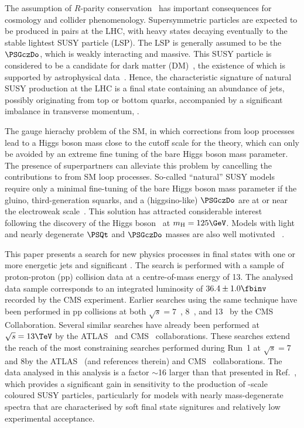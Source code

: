 The assumption of $R$-parity conservation~\cite{Farrar:1978xj} has
important consequences for cosmology and collider
phenomenology. Supersymmetric particles are expected to be produced in
pairs at the LHC, with heavy states decaying eventually to the stable
lightest SUSY particle (LSP). The LSP is generally assumed to be the
$\PSGczDo$, which is weakly interacting and massive. This SUSY
particle is considered to be a candidate for dark matter
(DM)~\cite{Jungman:1995df}, the existence of which is supported by
astrophysical data~\cite{1674-1137-38-9-090001}. Hence, the
characteristic signature of natural SUSY production at the LHC is a
final state containing an abundance of jets, possibly originating from
top or bottom quarks, accompanied by a significant imbalance in
transverse momentum, \ptvecmiss. 

The gauge hierachy problem of the SM, in which corrections from loop
processes lead to a Higgs boson mass \higgsmass close to the cutoff
scale for the theory, which can only be avoided by an extreme fine
tuning of the bare Higgs boson mass parameter. The presence of
superpartners can alleviate this problem by cancelling the
contributions to \higgsmass from SM loop processes. So-called
``natural'' SUSY models require only a minimal fine-tuning of the bare
Higgs boson mass parameter if the gluino, third-generation squarks,
and a (higgsino-like) $\PSGczDo$ are at or near the electroweak
scale~\cite{ref:barbierinsusy}. This solution has attracted
considerable interest~\cite{Delgado:2012eu, Boehm:1999tr,
  Carena:2008mj, Grober:2014aha, Grober:2015fia} following the
discovery of the Higgs boson~\cite{ref:atlashiggsdiscovery,
  ref:cmshiggsdiscovery, ref:cmshiggsdiscoverylong} at $\higgsmass =
125\GeV$. Models with light and nearly degenerate $\PSQt$ and
$\PSGczDo$ masses are also well motivated ~\cite{Boehm:1999bj,
  Balazs:2004bu, Martin:2007gf, Martin:2007hn}. 

This paper presents a search for new physics processes in final states
with one or more energetic jets and significant \ptvecmiss. The search
is performed with a sample of proton-proton (pp) collision data at a
centre-of-mass energy of 13\TeV. The analysed data sample corresponds
to an integrated luminosity of $36.4 \pm 1.0\fbinv$ recorded by the
CMS experiment. Earlier searches using the same technique have been
performed in pp collisions at both $\sqrt{s} = 7$~\cite{RA1Paper,
  RA1Paper2011, RA1Paper2011FULL}, 8~\cite{RA1Paper2012, RA1Parked},
and 13\TeV~\cite{RA1Paper2015} by the CMS Collaboration. Several
similar searches have already been performed at $\sqrt{s} = 13\TeV$ by
the ATLAS~\cite{} and CMS~\cite{} collaborations. These searches
extend the reach of the most constraining searches performed during
Run~1 at $\sqrt{s} = 7$ and 8\TeV by the ATLAS~\cite{Aad:2015iea,
  Aad:2015pfx} (and references therein) and CMS~\cite{}
collaborations. The data analysed in this analysis is a factor
$\sim$16 larger than that presented in Ref.~\cite{RA1Paper2015}, which
provides a significant gain in sensitivity to the production of
\TeV-scale coloured SUSY particles, particularly for models with
nearly mass-degenerate spectra that are characterised by soft final
state signitures and relatively low experimental acceptance.

